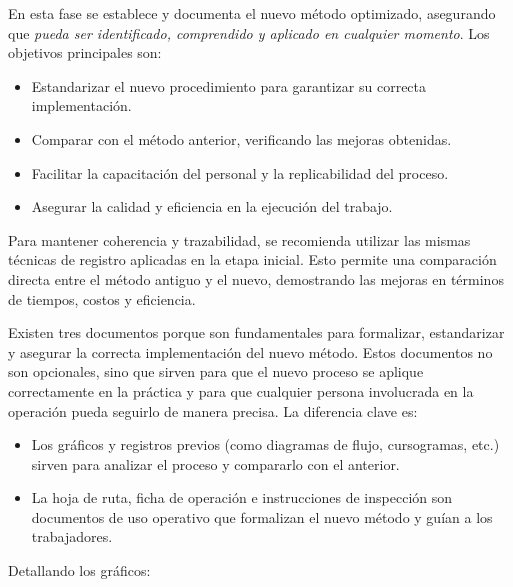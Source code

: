 \documentclass[a4paper,oneside,11pt]{article}
\begin{document}
En esta fase se establece y documenta el nuevo método optimizado, asegurando que \textit{pueda ser identificado, comprendido y aplicado en cualquier momento}. Los objetivos principales son:

\begin{itemize}
    \item Estandarizar el nuevo procedimiento para garantizar su correcta implementación.
    \item Comparar con el método anterior, verificando las mejoras obtenidas.
    \item Facilitar la capacitación del personal y la replicabilidad del proceso.
    \item Asegurar la calidad y eficiencia en la ejecución del trabajo.
\end{itemize}

Para mantener coherencia y trazabilidad, se recomienda utilizar las mismas técnicas de registro aplicadas en la etapa inicial. Esto permite una comparación directa entre el método antiguo y el nuevo, demostrando las mejoras en términos de tiempos, costos y eficiencia.

Existen tres documentos porque son fundamentales para formalizar, estandarizar y asegurar la correcta implementación del nuevo método. Estos documentos no son opcionales, sino que sirven para que el nuevo proceso se aplique correctamente en la práctica y para que cualquier persona involucrada en la operación pueda seguirlo de manera precisa. La diferencia clave es:
\begin{itemize}
    \item Los gráficos y registros previos (como diagramas de flujo, cursogramas, etc.) sirven para analizar el proceso y compararlo con el anterior.
    \item La hoja de ruta, ficha de operación e instrucciones de inspección son documentos de uso operativo que formalizan el nuevo método y guían a los trabajadores.
\end{itemize}

Detallando los gráficos:
\end{document}
